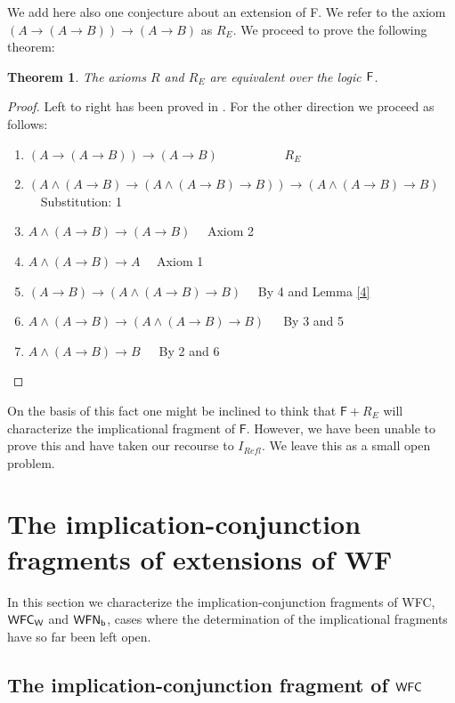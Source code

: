 \documentclass[12pt]{article}
\newtheorem{thm}{Theorem}[section]
\begin{document}
We add here also one conjecture about an extension of {\sf F}.
We refer to the axiom $ (A\rightarrow (A\rightarrow B))\rightarrow (A\rightarrow B) $ as $  R_{E} $. We proceed to prove the following theorem:
\begin{thm}
The axioms $   R $ and $  R_{E} $ are equivalent over the logic $ {\sf F} $.
\end{thm}
\begin{proof}
Left to right has been proved in \cite{Co}. For the other direction we proceed as follows:
\begin{enumerate}
\item $ (A\rightarrow (A\rightarrow B))\rightarrow (A\rightarrow B) $ ~~~~~~~~~~$ R_{E} $
\item $ (A\wedge (A\rightarrow B )\rightarrow (A\wedge (A\rightarrow B)\rightarrow B))\rightarrow (A\wedge (A\rightarrow B)\rightarrow B) $ ~~Substitution: 1
\item $A\wedge(A\rightarrow B)\rightarrow (A\rightarrow B)$ ~~Axiom 2
\item $A\wedge(A\rightarrow B)\rightarrow A$ ~~Axiom 1
\item $ (A\rightarrow B)\rightarrow (A\wedge(A\rightarrow B)\rightarrow B) $ ~~By 4 and Lemma \ref{4}
\item $A\wedge(A\rightarrow B)\rightarrow (A\wedge(A\rightarrow B)\rightarrow B)$~~~By 3 and 5
\item $A\wedge(A\rightarrow B)\rightarrow B$~~~By 2 and 6
\end{enumerate}

\end{proof}
On the basis of this fact one might be inclined to think that $\mathsf{F}+ R_{E} $ will characterize  the implicational fragment of $\mathsf{F} $. However, we have been unable to prove this and have taken our recourse to $ I_{Refl} $. We leave this as a small open problem.





\section{The implication-conjunction fragments of extensions of {\sf WF}}\label{icextwf}

In this section we characterize the implication-conjunction fragments of {\sf WFC}, ${\sf WFC_{W}}$ and ${\sf WFN_{b}}$, cases where the determination of the implicational fragments have so far been left open.

\subsection{The implication-conjunction fragment of ${\sf WFC}$}
\end{document}
